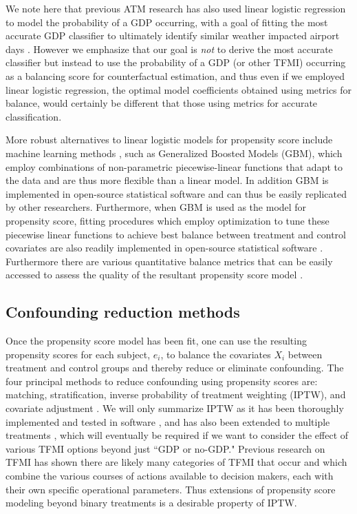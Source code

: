 \documentclass[11pt]{scrartcl}
\begin{document}
We note here that previous ATM research has also used linear logistic regression to model the probability of a GDP occurring, with a goal of fitting the most accurate GDP classifier to ultimately identify similar weather impacted airport days \cite{Grabbe:2014aa}.  However we emphasize that our goal is \emph{not} to derive the most accurate classifier but instead to use the probability of a GDP (or other TFMI) occurring as a balancing score for counterfactual estimation, and thus even if we employed linear logistic regression, the optimal model coefficients obtained using metrics for balance, would certainly be different that those using metrics for accurate classification.

More robust alternatives to linear logistic models for propensity score include machine learning methods \cite{lee2010improving}, such as Generalized Boosted Models (GBM), which employ combinations of non-parametric piecewise-linear functions that adapt to the data and are thus more flexible than a linear model.  In addition GBM is implemented in open-source statistical software \cite{ridgeway2006gbm} and can thus be easily replicated by other researchers.  Furthermore, when GBM is used as the model for propensity score, fitting procedures which employ optimization to tune these piecewise linear functions to achieve best balance between treatment and control covariates are also readily implemented in open-source statistical software \cite{ridgeway2015toolkit}.  Furthermore there are various quantitative balance metrics that can be easily accessed to assess the quality of the resultant propensity score model \cite{ridgeway2015toolkit}. 

\subsection*{Confounding reduction methods}
Once the propensity score model has been fit, one can use the resulting propensity scores for each subject, $e_i$, to balance the covariates $X_i$ between treatment and control groups and thereby reduce or eliminate confounding.  The four principal methods to reduce confounding using propensity scores are: matching, stratification, inverse probability of treatment weighting (IPTW), and covariate adjustment \cite{austin2011introduction}.  We will only summarize IPTW as it has been thoroughly implemented and tested in software \cite{ridgeway2015toolkit}, and has also been extended to multiple treatments \cite{mccaffrey2013tutorial}, which will eventually be required if we want to consider the effect of various TFMI options beyond just ``GDP or no-GDP."  Previous research on TFMI \cite{tfmireport} has shown there are likely many categories of TFMI that occur and which combine the various courses of actions available to decision makers, each with their own specific operational parameters. Thus extensions of propensity score modeling beyond binary treatments is a desirable property of IPTW.
\end{document}
